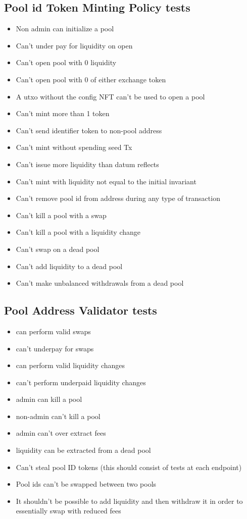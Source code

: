 \documentclass{article}
\begin{document}
\subsection*{Pool id Token Minting Policy tests}

\begin{itemize}
	\item Non admin can initialize a pool
	\item Can't under pay for liquidity on open
	\item Can't open pool with 0 liquidity
	\item Can't open pool with 0 of either exchange token
	\item A utxo without the config NFT can't be used to open a pool
	\item Can't mint more than 1 token
	\item Can't send identifier token to non-pool address
	\item Can't mint without spending seed Tx
	\item Can't issue more liquidity than datum reflects
	\item Can't mint with liquidity not equal to the initial invariant
	\item Can't remove pool id from address during any type of transaction
	\item Can't kill a pool with a swap
	\item Can't kill a pool with a liquidity change
	\item Can't swap on a dead pool
	\item Can't add liquidity to a dead pool
	\item Can't make unbalanced withdrawals from a dead pool
\end{itemize}

\subsection*{Pool Address Validator tests}

\begin{itemize}
	\item can perform valid swaps
	\item can't underpay for swaps
	\item can perform valid liquidity changes
	\item can't perform underpaid liquidity changes
	\item admin can kill a pool
	\item non-admin can't kill a pool
	\item admin can't over extract fees
	\item liquidity can be extracted from a dead pool
	\item Can't steal pool ID tokens (this should consist of tests at each endpoint)
	\item Pool ids can't be swapped between two pools
  \item It shouldn't be possible to add liquidity and then withdraw it in order to essentially swap with
    reduced fees
\end{itemize}
\end{document}
